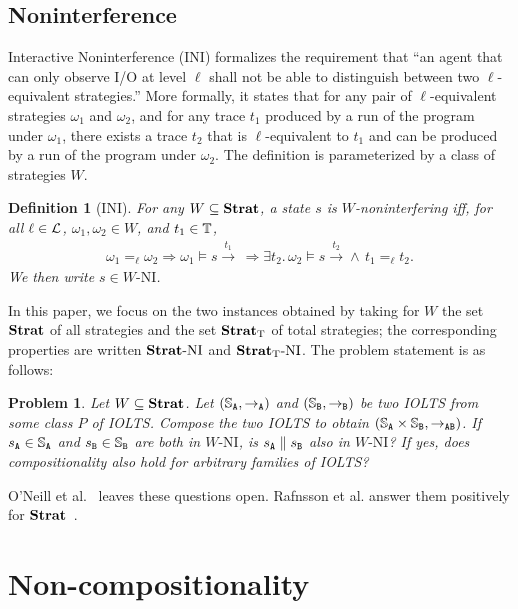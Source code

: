 \documentclass[preprint,5p,twocolumn]{elsarticle}
\newtheorem{definition}[theorem]{Definition}
\newtheorem{problem}[theorem]{Problem}
\begin{document}
\subsection{Noninterference}

Interactive Noninterference (INI) formalizes the requirement that ``an agent that can only observe
I/O at level $\ell$ shall not be able to distinguish between two $\ell$-equivalent strategies.''
More formally, it states that for any pair of $\ell$-equivalent strategies $\omega_1$
and $\omega_2$, and for any trace $t_1$ produced by a run of the program under $\omega_1$,
there exists a trace $t_2$ that is $\ell$-equivalent to $t_1$ and can be produced by a run of the
program under $\omega_2$. The definition is parameterized by a class of strategies $W$.

\begin{definition}[INI]
  \label{def:INI}
  For any $W \subseteq \mathbf{Strat}$, a state $s$ is $W$-noninterfering iff, for all $\ell \in \mathcal{L}$, $\omega_1,\omega_2 \in W$, and $t_1 \in \mathbb{T}$,
  \begin{align*}
\omega_1 =_\ell \omega_2 \Longrightarrow \omega_1 \models s \xrightarrow{t_1}\,\Longrightarrow \exists t_2.\,\omega_2 \models s \xrightarrow{t_2} \land\, t_1 =_\ell t_2.
  \end{align*}
  We then write $s \in W\text{-NI}$.
\end{definition}

In this paper, we focus on the two instances obtained by taking for $W$ the set $\mathbf{Strat}$ of all
strategies and the set $\mathbf{Strat}_{\mathrm{T}}$ of total strategies; the corresponding properties are written
$\mathbf{Strat}\text{-}\mathrm{NI}$ and $\mathbf{Strat}_{\mathrm{T}}\text{-}\mathrm{NI}$. The problem statement is as follows:
\begin{problem}
  Let $W \subseteq \mathbf{Strat}$. Let $(\mathbb{S}_{\mathtt{A}}, \rightarrow_{\mathtt{A}})$ and $(\mathbb{S}_{\mathtt{B}}, \rightarrow_{\mathtt{B}})$ be two IOLTS from some class $P$ of IOLTS. Compose the two IOLTS to obtain $(\mathbb{S}_{\mathtt{A}} \times \mathbb{S}_{\mathtt{B}}, \rightarrow_{\mathtt{AB}})$. If $s_{\mathtt{A}} \in \mathbb{S}_{\mathtt{A}}$ and $s_{\mathtt{B}} \in \mathbb{S}_{\mathtt{B}}$ are both in $W\text{-NI}$, is $s_{\mathtt{A}} \parallel s_{\mathtt{B}}$ also in $W\text{-NI}$? If yes, does compositionality also hold for arbitrary families of IOLTS?
\end{problem}

O'Neill et al.~\cite{ONeill2006} leaves these questions open. Rafnsson et al. answer them positively for $\mathbf{Strat}$~\cite[Theorem V.1]{Rafnsson2012}.

\section{Non-compositionality}
\end{document}
